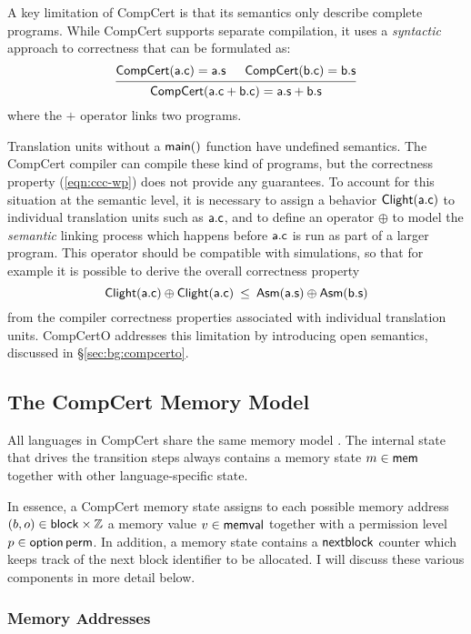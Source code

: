 A key limitation of CompCert
is that its semantics only describe complete programs.
While CompCert supports separate compilation,
it uses a \emph{syntactic} approach to correctness
that can be formulated as:
\[
  \begin{prooftree}
    \hypo{\kw{CompCert}(\kw{a.c}) = \kw{a.s}}
    \hypo{\kw{CompCert}(\kw{b.c}) = \kw{b.s}}
    \infer2{\kw{CompCert}(\kw{a.c} + \kw{b.c}) = \kw{a.s} + \kw{b.s}}
  \end{prooftree}
\]
where the $+$ operator links two programs.

Translation units without a $ \mathsf{main()} $ function
have undefined semantics.
The CompCert compiler can compile
these kind of programs,
but the correctness property (\ref{eqn:ccc-wp})
does not provide any guarantees.
To account for this situation
at the semantic level,
it is necessary to assign a behavior $ \mathsf{Clight} ( \mathsf{a.c} )$
to individual translation units such as $ \mathsf{a.c} $,
and to define an operator $\oplus$ to
model the \emph{semantic} linking process
which happens before $ \mathsf{a.c} $
is run as part of a larger program.
This operator should be compatible with simulations,
so that for example it is possible to derive the overall correctness property
\[
   \mathsf{Clight} ( \mathsf{a.c} ) \oplus  \mathsf{Clight} ( \mathsf{a.c} )
  \:\le\:
   \mathsf{Asm} ( \mathsf{a.s} ) \oplus  \mathsf{Asm} ( \mathsf{b.s} )
\]
from the compiler correctness properties
associated with individual translation units.
CompCertO addresses this limitation
by introducing open semantics,
discussed in \S\ref{sec:bg:compcerto}.

\subsection{The CompCert Memory Model}

All languages in CompCert
share the same memory model \citep{compcertmm}.
The internal state that drives the transition steps
always contains a memory state $m \in  \mathsf{mem} $
together with other language-specific state.

In essence,
a CompCert memory state
assigns to each possible memory address $(b, o) \in  \mathsf{block}  \times \mathbb{Z}$
a memory value $v \in  \mathsf{memval} $
together with a permission level $p \in  \mathsf{option} \, \mathsf{perm} $.
In addition,
a memory state contains a $ \mathsf{nextblock} $ counter
which keeps track of the next block identifier to be allocated.
I will discuss these various components in more detail below.

\subsubsection{Memory Addresses}

